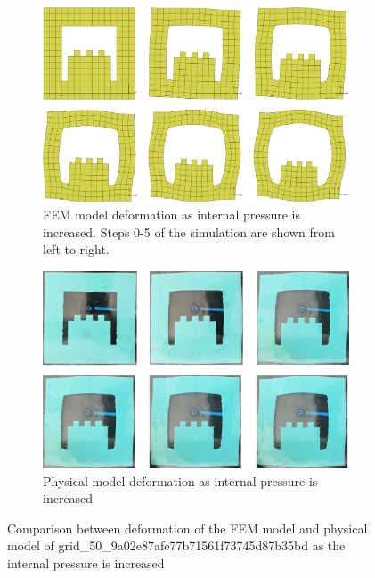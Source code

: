 \begin{figure}[H]
	\centering
	\begin{subfigure}[c]{\textwidth}
		\centering
		\includegraphics[width=\textwidth]{unit3deffem.png}
		\caption{FEM model deformation as internal pressure is increased. Steps 0-5 of the simulation are shown from left to right.}
	\end{subfigure}
	\hfill
	\begin{subfigure}[c]{\textwidth}
		\centering
		\includegraphics[width=\textwidth]{unit3defmod.png}
		\caption{Physical model deformation as internal pressure is increased}
	\end{subfigure}
	\caption[Comparison between FEM and physical models of unit 3]{Comparison between deformation of the FEM model and physical model of grid\_50\_9a02e87afe77b71561f73745d87b35bd as the internal pressure is increased}
	\label{fig:unit3def}
\end{figure}


